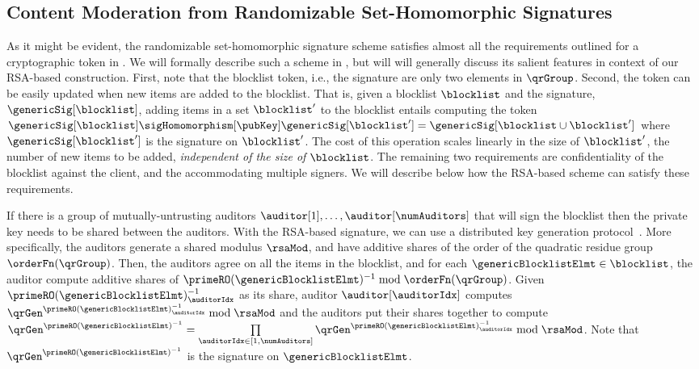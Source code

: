\subsection{Content Moderation from Randomizable Set-Homomorphic Signatures}
%
As it might be evident, the randomizable set-homomorphic signature scheme satisfies almost all the 
requirements outlined for a cryptographic token in . We will formally describe such 
a scheme in , but will will generally discuss its salient features in context of our 
RSA-based construction. First, note that the blocklist token, i.e., the signature are only two elements 
in $\qrGroup$. Second, the token can be easily updated when new items are added to the blocklist. 
That is, given a blocklist $\blocklist$ and the signature, $\genericSig[\blocklist]$, adding items in a set 
$\blocklist'$ to the blocklist entails computing the token $\genericSig[\blocklist] 
\sigHomomorphism[\pubKey] \genericSig[\blocklist'] = \genericSig[\blocklist \cup \blocklist']$ where 
$\genericSig[\blocklist']$ is the signature on $\blocklist'$. The cost of this operation scales linearly in 
the size of $\blocklist'$, the number of new items to be added, \textit{independent of the size of 
$\blocklist$}.  The remaining two requirements are confidentiality of the blocklist 
against the client, and the accommodating multiple signers. We will describe below how the 
RSA-based scheme can satisfy these requirements. 


%
If there is a group of mutually-untrusting auditors $\auditor[1], \dots, \auditor[\numAuditors]$ that 
will sign the blocklist then the private key 
needs to be shared between the auditors. With the RSA-based signature, we can use a
distributed key generation protocol~\cite{}. More specifically, the auditors generate a shared 
modulus $\rsaMod$, and have 
additive shares of the order of the quadratic residue group $\orderFn(\qrGroup)$. Then, the auditors 
agree on all the items in the blocklist, and for each $\genericBlocklistElmt \in \blocklist$, the auditor 
compute additive shares of $\primeRO(\genericBlocklistElmt)^{-1} \bmod \orderFn(\qrGroup)$. 
Given 
$\primeRO(\genericBlocklistElmt)^{-1}_{\auditorIdx}$ as its share, auditor $\auditor[\auditorIdx]$ 
computes 
$\qrGen^{\primeRO(\genericBlocklistElmt)^{-1}_{\auditorIdx}} \bmod \rsaMod$ and the auditors put 
their shares 
together to compute $\qrGen^{\primeRO(\genericBlocklistElmt)^{-1}} = \prod\limits_{\auditorIdx \in 
	[1, 
	\numAuditors]} \qrGen^{\primeRO(\genericBlocklistElmt)^{-1}_{\auditorIdx}} \bmod \rsaMod$. Note 
that $\qrGen^{\primeRO(\genericBlocklistElmt)^{-1}}$ is the signature on $\genericBlocklistElmt$.

